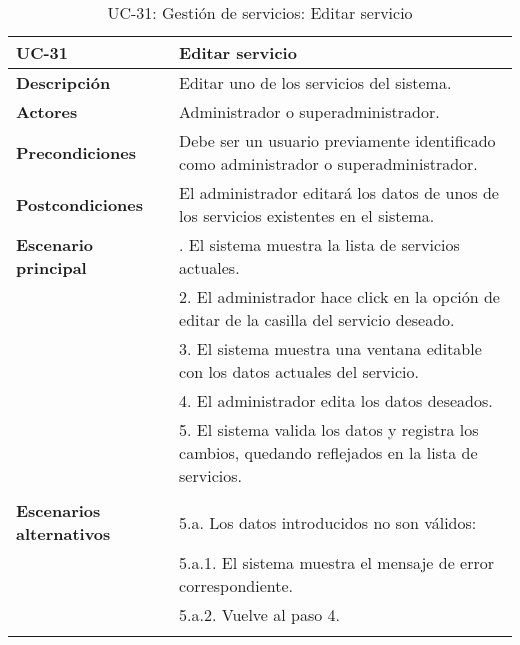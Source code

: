 \begin{table}[H]
  \begin{center}
    \begin{tabularx}{16.4cm}{|l|X|}
      \hline
      \textbf{UC-31} & \textbf{Editar servicio}\\
      \hline
      \textbf{Descripción} & Editar uno de los servicios del sistema.\\
      \hline
      \textbf{Actores} & Administrador o superadministrador.\\
      \hline
      \textbf{Precondiciones} & Debe ser un usuario previamente identificado como administrador o superadministrador.\\
      \hline
      \textbf{Postcondiciones} & El administrador editará los datos de unos de los servicios existentes en el sistema.\\
      \hline
      \textbf{Escenario principal} & \smallskip 1. El sistema muestra la lista de servicios actuales.\\
      & 2. El administrador hace click en la opción de editar de la casilla del servicio deseado.\\
      & 3. El sistema muestra una ventana editable con los datos actuales del servicio.\\
      & 4. El administrador edita los datos deseados.\\
      & 5. El sistema valida los datos y registra los cambios, quedando reflejados en la lista de servicios.\\
      & \\
      \hline
      \textbf{Escenarios alternativos} & \smallskip 5.a. Los datos introducidos no son válidos:\\
      & \hspace{0.3cm} 5.a.1. El sistema muestra el mensaje de error correspondiente.\\
      & \hspace{0.3cm} 5.a.2. Vuelve al paso 4.\\
      & \\
      \hline
    \end{tabularx}
    \caption{UC-31: Gestión de servicios: Editar servicio}
  \end{center}
\end{table}



